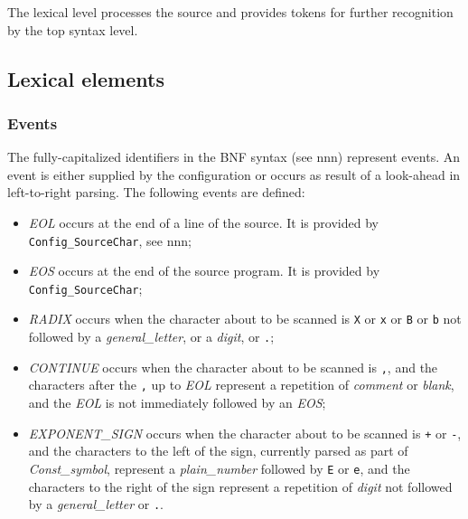 The lexical level processes the source and provides tokens for further
recognition by the top syntax level.

\subsection{Lexical elements}\label{lexical-elements}

\subsubsection{Events}\label{events}

The fully-capitalized identifiers in the BNF syntax (see nnn) represent
events. An event is either supplied by the configuration or occurs as
result of a look-ahead in left-to-right parsing. The following events
are defined:

\begin{itemize}
\item
  \emph{EOL} occurs at the end of a line of the source. It is provided
  by \texttt{Config\_SourceChar}, see nnn;
\item
  \emph{EOS} occurs at the end of the source program. It is provided by
  \texttt{Config\_SourceChar};
\item
  \emph{RADIX} occurs when the character about to be scanned is
  \texttt{\textquotesingle{}X\textquotesingle{}} or
  \texttt{\textquotesingle{}x\textquotesingle{}} or
  \texttt{\textquotesingle{}B\textquotesingle{}} or
  \texttt{\textquotesingle{}b\textquotesingle{}} not followed by a
  \emph{general\_letter}, or a \emph{digit}, or
  \texttt{\textquotesingle{}.\textquotesingle{}};
\item
  \emph{CONTINUE} occurs when the character about to be scanned is
  \texttt{\textquotesingle{},\textquotesingle{}}, and the characters
  after the \texttt{\textquotesingle{},\textquotesingle{}} up to
  \emph{EOL} represent a repetition of \emph{comment} or \emph{blank},
  and the \emph{EOL} is not immediately followed by an \emph{EOS};
\item
  \emph{EXPONENT\_SIGN} occurs when the character about to be scanned is
  \texttt{\textquotesingle{}+\textquotesingle{}} or
  \texttt{\textquotesingle{}-\textquotesingle{}}, and the characters to
  the left of the sign, currently parsed as part of
  \emph{Const\_symbol}, represent a \emph{plain\_number} followed by
  \texttt{\textquotesingle{}E\textquotesingle{}} or
  \texttt{\textquotesingle{}e\textquotesingle{}}, and the characters to
  the right of the sign represent a repetition of \emph{digit} not
  followed by a \emph{general\_letter} or
  \texttt{\textquotesingle{}.\textquotesingle{}}.
\end{itemize}

